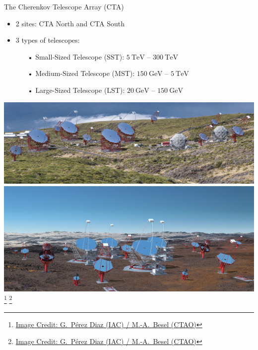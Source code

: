 \begin{frame}{The Cherenkov Telescope Array (CTA)}
    \begin{minipage}{0.55\textwidth}
      \begin{itemize}
        \setlength\itemsep{1em}
        \item 2 sites: CTA North and CTA South
        \item 3 types of telescopes:
        \begin{itemize}
          \setlength\itemsep{0.5em}
          \item [•] Small-Sized Telescope (SST): \;\(\SI{5}{\tera\eV}\) -- \(\SI{300}{\tera\eV}\)
          \item [•] Medium-Sized Telescope (MST): \;\(\SI{150}{\giga\eV}\) -- \(\SI{5}{\tera\eV}\)
          \item [•] Large-Sized Telescope (LST): \;\(\SI{20}{\giga\eV}\) -- \(\SI{150}{\giga\eV}\)
        \end{itemize}
      \end{itemize}
    \end{minipage}
    \begin{minipage}{0.42\textwidth}
      \begin{center}
        \includegraphics[width=\textwidth]{graphics/cta_north_render.jpg}
        \includegraphics[width=\textwidth]{graphics/cta_south_render.jpg}
        \vspace{-0.25cm}
        {%
        \footnote{\href{https://www.cta-observatory.org/about/how-cta-works/}{\textcolor{white!85!black}{Image Credit: G.~Pérez Diaz (IAC) / M.-A.~Besel (CTAO)}}}
        }
        {%
        \footnote{\href{https://www.cta-observatory.org/about/how-cta-works/}{\textcolor{darkgray!85!black}{Image Credit: G.~Pérez Diaz (IAC) / M.-A.~Besel (CTAO)}}}
        }
      \end{center}
    \end{minipage}
  \end{frame}
